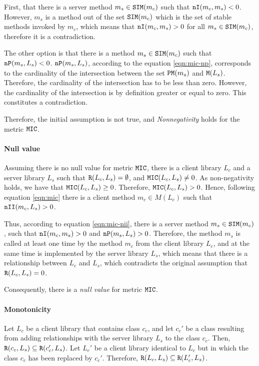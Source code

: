 First, that there is a server method $m_s \in \verb|SIM|(m_c)$ such that $\verb|nI|(m_c, m_s) < 0$. However, $m_s$ is a method out of the set $\verb|SIM|(m_c)$ which is the set of stable methods invoked by $m_c$, which means that $\verb|nI|(m_c, m_s) > 0$ for all $m_s \in \verb|SIM|(m_c)$, therefore it is a contradiction.

The other option is that there is a method $m_s \in \verb|SIM|(m_c)$ such that $\verb|nP|(m_s, L_s) < 0$. $\verb|nP|(m_s, L_s)$, according to the equation \ref{eqn:mic-np}, corresponds to the cardinality of the intersection between the set $\verb|PM|(m_s)$ and $\verb|M|(L_s)$. Therefore, the cardinality of the intersection has to be less than zero. However, the cardinality of the intersection is by definition greater or equal to zero. This constitutes a contradiction.

Therefore, the initial assumption is not true, and \textit{Nonnegativity} holds for the metric $\verb|MIC|$.

\paragraph{Null value}
Assuming there is no null value for metric $\verb|MIC|$, there is a client library $L_c$ and a server library $L_s$ such that $\verb|R|(L_c, L_s) = \emptyset$, and $\verb|MIC|(L_c, L_s)	\neq 0$. As non-negativity holds, we have that $\verb|MIC|(L_c, L_s) \ge 0$. Therefore, $\verb|MIC|(L_c, L_s) > 0$. Hence, following equation \ref{eqn:mic} there is a client method $m_c \in M(L_c)$ such that $\verb|nII|(m_c, L_s) > 0$.

Thus, according to equation \ref{eqn:mic-nii}, there is a server method $m_s \in \verb|SIM|(m_c)$, such that $\verb|nI|(m_c, m_s) > 0$ and $\verb|nP|(m_s, L_s) > 0$. Therefore, the method $m_s$ is called at least one time by the method $m_c$ from the client library $L_c$, and at the same time is implemented by the server library $L_s$, which means that there is a relationship between $L_c$ and $L_s$, which contradicts the original assumption that $\verb|R|(L_c, L_s) = 0$.

Consequently, there is a \textit{null value} for metric $\verb|MIC|$.

\paragraph{Monotonicity}
Let $L_c$ be a client library that contains class $c_c$, and let $c_c'$ be a class resulting from adding relationships with the server library $L_s$ to the class $c_c$. Then, $\verb|R|(c_c, L_s) \subseteq \verb|R|(c_c', L_s)$. Let $L_c'$ be a client library identical to $L_c$ but in which the class $c_c$ has been replaced by $c_c'$. Therefore, $\verb|R|(L_c, L_s) \subseteq \verb|R|(L_c', L_s)$.

